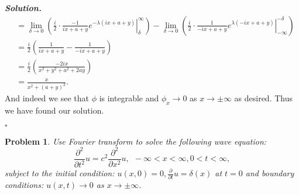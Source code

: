 \documentclass[12pt]{report}
\newtheorem{problem}{Problem}
\newenvironment{solution}[1][\it{Solution}]{\textbf{#1. } }{$\square$}
\newcommand{\paren}[1]{{\left(#1\right)}} %
\newcommand{\pp}[2]{\frac{\partial #1}{\partial #2}} %
\newcommand{\ppn}[3]{\frac{\partial^{#1} #2}{\partial #3^{#1}}} %
\begin{document}
\begin{solution}
\begin{align*}
        &= \lim_{\delta \to 0}\paren{\left. \frac{i}{2} \cdot \frac{-1}{ix + a + y}e^{-\lambda(ix + a + y)}\right|_{\delta}^{\infty}} - \lim_{\delta \to 0}\paren{ \left. \frac{i}{2} \cdot \frac{1}{-ix + a + y}e^{\lambda(-ix + a + y)} \right|_{-\infty}^{-\delta}}\\
        &= \frac{i}{2} \paren{\frac{1}{ix + a + y} - \frac{1}{-ix + a + y}}\\
        &= \frac{i}{2}\paren{\frac{-2ix}{x^2 + y^2 + a^2 +2 ay}}\\
        &= \frac{x}{x^2 + (a + y)^2}.
    \end{align*}
    And indeed we see that $\phi$ is integrable and $\phi_x \to 0$ as $x \to \pm \infty$ as desired. Thus we have found our solution. 


\end{solution}

\newpage



\begin{problem}
    Use Fourier transform to solve the following wave equation:
    \[\ppn{2}{}{t}u = c^2 \ppn{2}{}{x}u, ~~ -\infty < x < \infty, 0 < t < \infty,\]
    subject to the initial condition: $u(x,0) = 0, \pp{}{t}u=\delta(x)$ at $t=0$ and boundary conditions: $u(x,t) \to 0$ as $x \to \pm \infty$. 
\end{problem}
\end{document}
